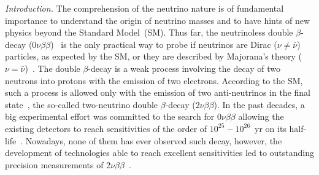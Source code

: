 \documentclass[%
reprint,
superscriptaddress,
altaffilletter,
showpacs,
showkeys,
amsmath, amssymb, aps,prl, floatfix
]{revtex4-1}
\newcommand{\HalfLifenewred}{T_{1/2}^{2\nu} = [8.69 \pm 0.05 \textrm{(stat.)}~^{+0.09}_{-0.06} \textrm{(syst.)}] \times 10^{19}~\textrm{yr}}
\newcommand{\onu}{$0\nu\beta \beta$\xspace}
\newcommand{\vv}{2$\nu\beta\beta$\xspace}
\begin{document}
\date{\today}

\begin{abstract}
We report on the results obtained with the global CUPID-0 background model, which combines the data collected in the two measurement campaigns for a total exposure of 16.6~kg$\times$yr. We identify with improved precision the background sources in the region of interest for neutrinoless double $\beta$-decay, making more solid the foundations for the background budget of the next-generation CUPID experiment. Relying on the excellent data reconstruction, we measure the two-neutrino double $\beta$-decay half-life of $^{82}$Se with unprecedented accuracy:
$\HalfLifenewred$.
\end{abstract}

\maketitle
{\it Introduction.} The comprehension of the neutrino nature is of fundamental importance to understand the origin of neutrino masses and to have hints of new physics beyond the Standard Model~(SM). Thus far, the neutrinoless double $\beta$-decay (\onu)~\cite{Furry:1939qr} is the only practical way to probe if neutrinos are Dirac ($\nu \neq\bar{\nu}$) particles, as expected by the SM, or they are described by Majorana's theory ($\nu=\bar{\nu}$)~\cite{DellOro:2016tmg}. The double $\beta$-decay is a weak process involving the decay of two neutrons into protons with the emission of two electrons. According to the SM, such a process is allowed only with the emission of two anti-neutrinos in the final state~\cite{GoeppertMayer}, the so-called two-neutrino double $\beta$-decay (\vv). %
In the past decades, a big experimental effort was committed to the search for \onu allowing the existing detectors to reach sensitivities of the order of $10^{25}-10^{26}$~yr on its half-life~\cite{GERDA:2020xhi,KamLAND-Zen:2022tow,CUORE:2021mvw}. Nowadays, none of them has ever observed such decay, however, the development of technologies able to reach excellent sensitivities led to outstanding precision measurements of \vv~\cite{Saakyan:2013yna,Barabash:2015eza,KamLAND-Zen:2019imh,NEMO-3:2019gwo}. 
\end{document}
